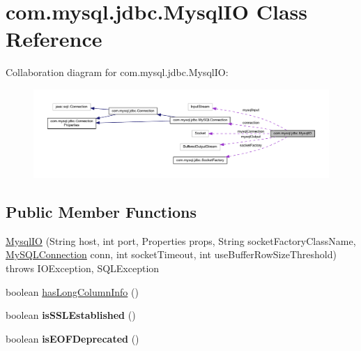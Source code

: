 \hypertarget{classcom_1_1mysql_1_1jdbc_1_1_mysql_i_o}{}\section{com.\+mysql.\+jdbc.\+Mysql\+IO Class Reference}
\label{classcom_1_1mysql_1_1jdbc_1_1_mysql_i_o}


Collaboration diagram for com.\+mysql.\+jdbc.\+Mysql\+IO\+:
\nopagebreak
\begin{figure}[H]
\begin{center}
\leavevmode
\includegraphics[width=350pt]{classcom_1_1mysql_1_1jdbc_1_1_mysql_i_o__coll__graph}
\end{center}
\end{figure}
\subsection*{Public Member Functions}
\begin{DoxyCompactItemize}
\item 
\mbox{\hyperlink{classcom_1_1mysql_1_1jdbc_1_1_mysql_i_o_a9b4e102e11948b0b76701c1c3ce3a4a9}{Mysql\+IO}} (String host, int port, Properties props, String socket\+Factory\+Class\+Name, \mbox{\hyperlink{interfacecom_1_1mysql_1_1jdbc_1_1_my_s_q_l_connection}{My\+S\+Q\+L\+Connection}} conn, int socket\+Timeout, int use\+Buffer\+Row\+Size\+Threshold)  throws I\+O\+Exception, S\+Q\+L\+Exception 
\item 
boolean \mbox{\hyperlink{classcom_1_1mysql_1_1jdbc_1_1_mysql_i_o_a128a14ef2f35a39db63a1e8cf5bf772b}{has\+Long\+Column\+Info}} ()
\item 
\mbox{\label{classcom_1_1mysql_1_1jdbc_1_1_mysql_i_o_ae3c7706cfd7affce7496e00714244abf}} 
boolean {\bfseries is\+S\+S\+L\+Established} ()
\item 
\mbox{\label{classcom_1_1mysql_1_1jdbc_1_1_mysql_i_o_a3ac54d9f5aa7caf1c58370e93099e27e}} 
boolean {\bfseries is\+E\+O\+F\+Deprecated} ()
\end{DoxyCompactItemize}
